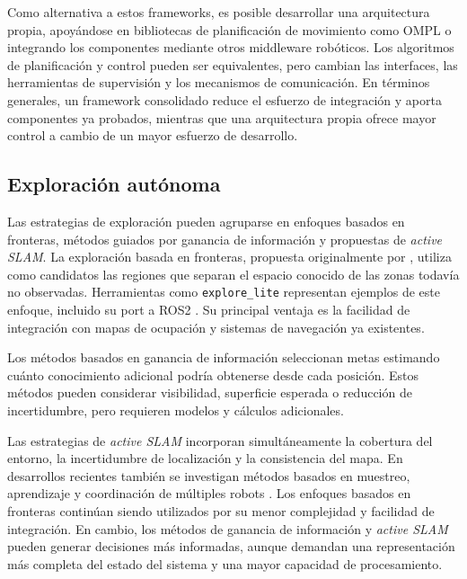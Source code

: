 Como alternativa a estos frameworks, es posible desarrollar una arquitectura
propia, apoyándose en bibliotecas de planificación de movimiento como OMPL
\citep{sucan2012ompl,ompl2026docs} o integrando los componentes mediante otros
middleware robóticos. Los algoritmos
de planificación y control pueden ser equivalentes, pero cambian las
interfaces, las herramientas de supervisión y los mecanismos de comunicación.
En términos generales, un framework consolidado reduce el esfuerzo de
integración y aporta componentes ya probados, mientras que una arquitectura
propia ofrece mayor control a cambio de un mayor esfuerzo de desarrollo.

\subsection{Exploración autónoma}
\label{sec:exploracion_alternativas}

Las estrategias de exploración pueden agruparse en enfoques basados en
fronteras, métodos guiados por ganancia de información y propuestas de
\textit{active SLAM}.
La exploración basada en fronteras, propuesta originalmente por
\citet{yamauchi1997frontier}, utiliza como candidatos las regiones que
separan el espacio conocido de las zonas todavía no observadas. Herramientas
como \texttt{explore\_lite} representan ejemplos de este enfoque, incluido
su port a \gls{ROS2} \citep{horner_mexplore,alvarez2021mexplore_ros2}. Su
principal ventaja es la facilidad de integración con mapas de ocupación y
sistemas de navegación ya existentes.

Los métodos basados en ganancia de información seleccionan metas estimando
cuánto conocimiento adicional podría obtenerse desde cada posición. Estos
métodos pueden considerar visibilidad, superficie esperada o reducción de
incertidumbre, pero requieren modelos y cálculos adicionales.

Las estrategias de \textit{active SLAM} incorporan simultáneamente la
cobertura del entorno, la incertidumbre de localización y la consistencia del
mapa. En desarrollos recientes también se investigan métodos basados en
muestreo, aprendizaje y coordinación de múltiples robots
\citep{placed2023active}.
Los enfoques basados en fronteras continúan siendo utilizados por su menor
complejidad y facilidad de integración. En cambio, los métodos de ganancia de
información y \textit{active SLAM} pueden generar decisiones más informadas,
aunque demandan una representación más completa del estado del sistema y una
mayor capacidad de procesamiento.

